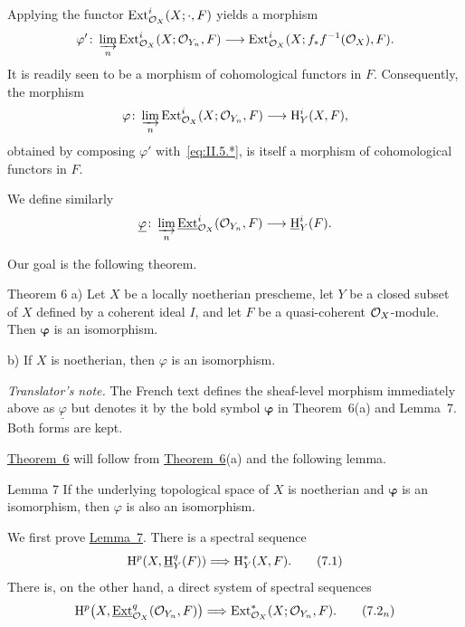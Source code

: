 Applying the functor $\operatorname{Ext}_{\mathcal O_X}^i(X;\mathord\cdot,F)$ yields a morphism
\[
  \varphi'\colon
  \varinjlim_n\operatorname{Ext}_{\mathcal O_X}^i(X;\mathcal O_{Y_n},F)
  \longrightarrow
  \operatorname{Ext}_{\mathcal O_X}^i(X;f_*f^{-1}(\mathcal O_X),F).
\]
It is readily seen to be a morphism of cohomological functors in $F$.
Consequently, the morphism
\[
  \varphi\colon
  \varinjlim_n\operatorname{Ext}_{\mathcal O_X}^i(X;\mathcal O_{Y_n},F)
  \longrightarrow \mathrm H_Y^i(X,F),
\]
obtained by composing $\varphi'$ with~\eqref{eq:II.5.*}, is itself a
morphism of cohomological functors in $F$.

We define similarly
\[
  \underline{\varphi}\colon
  \varinjlim_n\mathop{\underline{\mathrm{Ext}}}\nolimits_{\mathcal O_X}^i(\mathcal O_{Y_n},F)
  \longrightarrow \mathop{\underline{\mathrm H}}\nolimits_Y^i(F).
\]

Our goal is the following theorem.

\begin{sgastatement}{Theorem 6}
\textup{a)} Let $X$ be a locally noetherian prescheme, let $Y$ be a closed
subset of $X$ defined by a coherent ideal $I$, and let $F$ be a
quasi-coherent $\mathcal O_X$-module. Then $\boldsymbol{\varphi}$ is an isomorphism.

\textup{b)} If $X$ is noetherian, then $\varphi$ is an isomorphism.
\end{sgastatement}

\noindent\textit{Translator's note.} The French text defines the sheaf-level
morphism immediately above as $\underline{\varphi}$ but denotes it by the
bold symbol $\boldsymbol{\varphi}$ in Theorem~6(a) and Lemma~7. Both
forms are kept.

\hyperref[II.6]{Theorem~6} will follow from \hyperref[II.6]{Theorem~6}(a) and the following lemma.

\begin{sgastatement}{Lemma 7}
If the underlying topological space of $X$ is noetherian and
$\boldsymbol{\varphi}$ is an isomorphism, then $\varphi$ is also an
isomorphism.
\end{sgastatement}

We first prove \hyperref[II.7]{Lemma~7}. There is a spectral sequence
\begin{equation}
  \mathrm H^p(X,\mathop{\underline{\mathrm H}}\nolimits_Y^q(F))
  \Longrightarrow \mathrm H_Y^*(X,F).
  \tag{7.1}\label{eq:II.7.1}
\end{equation}
There is, on the other hand, a direct system of spectral sequences
\begin{equation}
  \mathrm H^p\bigl(X,\mathop{\underline{\mathrm{Ext}}}\nolimits_{\mathcal O_X}^q(\mathcal O_{Y_n},F)\bigr)
  \Longrightarrow \operatorname{Ext}_{\mathcal O_X}^*(X;\mathcal O_{Y_n},F).
  \tag{7.2$_n$}\label{eq:II.7.2n}
\end{equation}

